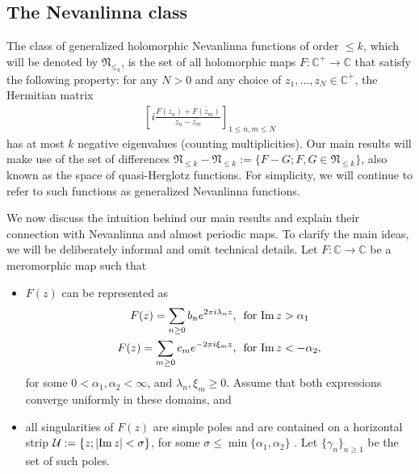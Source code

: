 \documentclass[a4paper,reqno,12pt]{amsart}
\newcommand{\U}{\mathcal{U}}
\newcommand{\NN}{\mathfrak{N}}
\newcommand{\cp}{\mathbb{C}} %
\newcommand{\la}{\lambda}
\newcommand{\ga}{\gamma}
\newcommand{\al}{\alpha}
\newcommand{\ov}[1]{\overline{#1}}
\newcommand{\1}{{\bf 1}}
\newcommand{\ra}{\rightarrow}
\renewcommand{\Im}{{\rm Im}\,}
\begin{document}
\subsection*{The Nevanlinna class} The class of generalized holomorphic Nevanlinna functions of order $\leq k$, which will be denoted by $\NN_{\leq_k}$, is the set of all holomorphic maps $F:\cp^+\ra\cp$ that satisfy the following property: for any $N>0$ and any choice of $z_1,...,z_N \in \cp^+$, the Hermitian matrix
\begin{align*}
\left[i\frac{F(z_n)+\ov{F(z_m)}}{z_n-\ov{z_m}}\right]_{1\leq n,m\leq N}
\end{align*}
has at most $k$ negative eigenvalues (counting multiplicities). Our main results will make use of the set of differences $\NN_{\leq k}-\NN_{\leq k}:=\{F-G;F,G\in\NN_{\leq k}\}$, also known as the space of quasi-Herglotz functions. For simplicity, we will continue to refer to such functions as generalized Nevanlinna functions.

We now discuss the intuition behind our main results and explain their connection with Nevanlinna and almost periodic maps. To clarify the main ideas, we will be deliberately informal and omit technical details. Let $F:\cp\ra\cp$ be a meromorphic map such that
\begin{itemize}
    \item[1)] $F(z)$ can be represented as
    \begin{align*}
    F(z)=\sum_{n\geq0} b_ne^{2\pi i\la_nz},&\,\, \text{ for } \Im{z}>\al_1\\
    F(z)=\sum_{m\geq0} c_me^{-2\pi i\xi_mz},&\,\, \text{ for } \Im{z}<-\al_2,
    \end{align*}
for some $0<\al_1,\al_2<\infty$, and $\la_n,\xi_m\geq0$. Assume that both expressions converge uniformly in these domains, and
    \item[2)] all singularities of $F(z)$ are simple poles and are contained on a horizontal strip $\U:=\{z;|\Im{z}|<\sigma\}$, for some $\sigma\leq\min\{\al_1,\al_2\}$ . Let $\{\ga_n\}_{n\geq1}$ be the set of such poles.
\end{itemize}
\end{document}
